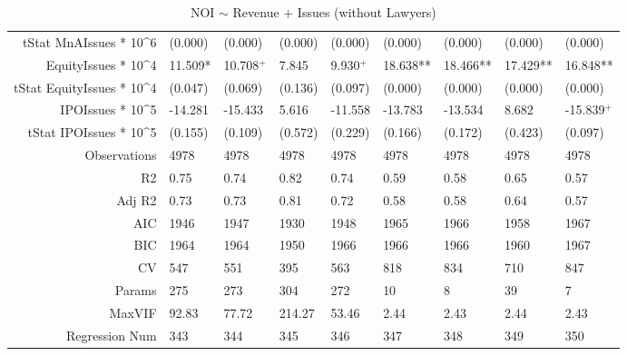 \begin{table}[ht]
\begin{tabular}{rllllllll}
  tStat MnAIssues * 10^6 & (0.000) & (0.000) & (0.000) & (0.000) & (0.000) & (0.000) & (0.000) & (0.000) \\ 
  EquityIssues * 10^4 & 11.509* & 10.708$^{+}$ & 7.845 & 9.930$^{+}$ & 18.638** & 18.466** & 17.429** & 16.848** \\ 
  tStat EquityIssues * 10^4 & (0.047) & (0.069) & (0.136) & (0.097) & (0.000) & (0.000) & (0.000) & (0.000) \\ 
  IPOIssues * 10^5 & -14.281 & -15.433 & 5.616 & -11.558 & -13.783 & -13.534 & 8.682 & -15.839$^{+}$ \\ 
  tStat IPOIssues * 10^5 & (0.155) & (0.109) & (0.572) & (0.229) & (0.166) & (0.172) & (0.423) & (0.097) \\ 
  Observations & 4978 & 4978 & 4978 & 4978 & 4978 & 4978 & 4978 & 4978 \\ 
  R2 & 0.75 & 0.74 & 0.82 & 0.74 & 0.59 & 0.58 & 0.65 & 0.57 \\ 
  Adj R2 & 0.73 & 0.73 & 0.81 & 0.72 & 0.58 & 0.58 & 0.64 & 0.57 \\ 
  AIC & 1946 & 1947 & 1930 & 1948 & 1965 & 1966 & 1958 & 1967 \\ 
  BIC & 1964 & 1964 & 1950 & 1966 & 1966 & 1966 & 1960 & 1967 \\ 
  CV & 547 & 551 & 395 & 563 & 818 & 834 & 710 & 847 \\ 
  Params & 275 & 273 & 304 & 272 & 10 & 8 & 39 & 7 \\ 
  MaxVIF & 92.83 & 77.72 & 214.27 & 53.46 & 2.44 & 2.43 & 2.44 & 2.43 \\ 
  Regression Num & 343 & 344 & 345 & 346 & 347 & 348 & 349 & 350 \\ 
   \hline
\end{tabular}
\caption{NOI $\sim$ Revenue + Issues (without Lawyers)} 
\end{table}
